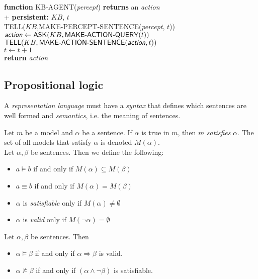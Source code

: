 \documentclass{article}
\begin{document}
\begin{pseudo}
    \textbf{function} KB-AGENT(\emph{percept}) \textbf{returns} an \emph{action} \\+
        \textbf{persistent:} $KB$, $t$\\
        TELL($KB$,MAKE-PERCEPT-SENTENCE(\emph{percept}, $t$))\\
        $\textsf{\emph{action}}\leftarrow\textsf{ASK}(KB,\textsf{MAKE-ACTION-QUERY}(t))$\\
        $\textsf{TELL}(KB, \textsf{MAKE-ACTION-SENTENCE}(\textsf{\emph{action}},t))$\\
        $t\leftarrow t+1$\\
        \textbf{return} \emph{action}
\end{pseudo}

\subsection{Propositional logic}

\begin{definition}
    A \emph{representation language} must have a \emph{syntax} that defines which
    sentences are well formed and \emph{semantics}, i.e. the meaning of sentences.
\end{definition}

\begin{definition}
    Let $m$ be a model and $\alpha$ be a sentence. If $\alpha$ is true in $m$, then
    $m$ \emph{satisfies} $\alpha$. The set of all models that satisfy $\alpha$ is
    denoted $M(\alpha)$.\\
    Let $\alpha,\beta$ be sentences. Then we define the following:
    \begin{itemize}
        \item $a\vDash b$ if and only if $M(\alpha)\subseteq M(\beta)$
        \item $a\equiv b$ if and only if $M(\alpha)=M(\beta)$
        \item $\alpha$ is \emph{satisfiable} only if $M(\alpha)\not=\emptyset$
        \item $\alpha$ is \emph{valid} only if $M(\neg\alpha)=\emptyset$
    \end{itemize}
\end{definition}

\begin{lemma}
    Let $\alpha,\beta$ be sentences. Then
    \begin{itemize}
        \item $\alpha\vDash\beta$ if and only if $\alpha\Rightarrow\beta$ is valid.
        \item $\alpha\not\vDash\beta$ if and only if $(\alpha\wedge\neg\beta)$ is satisfiable.
    \end{itemize}
\end{lemma}
\end{document}
